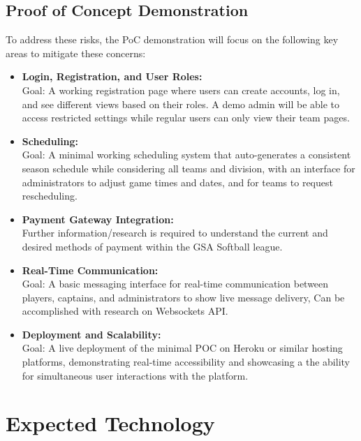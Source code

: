 \documentclass{article}
\begin{document}
\subsection{Proof of Concept Demonstration}

To address these risks, the PoC demonstration will focus on the following key areas to mitigate these concerns:

\begin{itemize}

	\item \textbf{Login, Registration, and User Roles:} \\
	Goal: A working registration page where users can create accounts, log in, and see different views based on their roles. A demo admin will be able to access restricted settings while regular users can only view their team pages. 

	\item \textbf{Scheduling:} \\
	Goal: A minimal working scheduling system that auto-generates a consistent season schedule while considering all teams and division, with an interface for administrators to adjust game times and dates, and for teams to request rescheduling. 

	\item \textbf{Payment Gateway Integration:} \\
	Further information/research is required to understand the current and desired methods of payment within the GSA Softball league. 

	\item \textbf{Real-Time Communication:} \\
	Goal: A basic messaging interface for real-time communication between players, captains, and administrators to show live message delivery, Can be accomplished with research on Websockets API.

	\item \textbf{Deployment and Scalability:} \\
	Goal: A live deployment of the minimal POC on Heroku or similar hosting platforms, demonstrating real-time accessibility and showcasing a the ability for simultaneous user interactions with the platform.

\end{itemize}


\section{Expected Technology}
\end{document}

